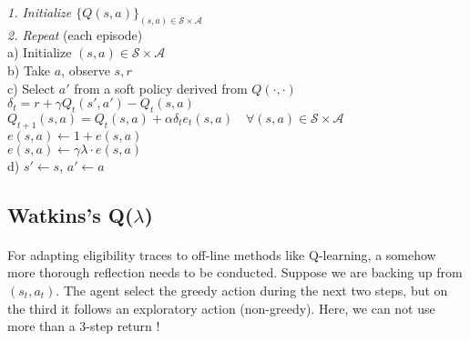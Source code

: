 \documentclass[a4paper]{article}
\newcommand\mS{\mathcal{S}}
\newcommand\mA{\mathcal{A}}
\newcommand\srsl{Sarsa($\lambda$)}
\begin{document}
{{			\coolbox{white}{\textcolor{blue}{\srsl}}
				{
					\begin{algorithm}[H]
	 				\SetAlgoLined
					\LinesNumbered
					 \textsf{\emph{1. Initialize $\{Q(s,a)\}_{(s,a)\in\mS\times\mA}$ }} \\
					\textsf{\emph{2. Repeat}} (each episode) \\
					\Indp \Indp a) Initialize $(s,a)\in\mS\times\mA$ \\
						  	  b) Take $a$, observe $s,r$ \\
							  c) Select $a'$ from a soft policy derived from $Q(\cdot,\cdot)$\\
							  \Indp \Indp 
							  	$\delta_t =  r+ \gamma Q_t(s',a') - Q_t(s,a)$ \\
								$Q_{t+1}(s,a) = Q_t(s,a) + \alpha \delta_t e_t(s,a) \quad \forall(s,a)\in\mS\times\mA$\\
								$ e(s,a) \leftarrow 1 + e(s,a)$	\\
								$ e(s,a) \leftarrow \gamma \lambda \cdot e(s,a)	$\\

							\Indm \Indm 
							d) $s'\leftarrow s$, $a'\leftarrow a$
				\end{algorithm}
				}

		}
		\subsection{Watkins's Q($\lambda$)}
		{
			\paragraph{} For adapting eligibility traces to off-line methods like Q-learning, a somehow more thorough reflection needs to be conducted. Suppose we are backing up from $(s_t,a_t)$. The agent select the greedy action during the next two steps, but on the third it follows an exploratory action (non-greedy). Here, we can not use more than a 3-step return ! 
			
}}
\end{document}
